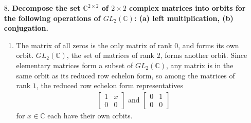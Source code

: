 \documentclass[a4paper,12pt]{article}
\begin{document}
\begin{enumerate}
    \item[8.]
        \boldmath
        \textbf{Decompose the set $\mathbb{C}^{2 \times 2}$ of $2 \times 2$ complex matrices into orbits for the following operations of $GL_2(\mathbb{C})$: (a) left multiplication, (b) conjugation.} \par
        \unboldmath
        \begin{enumerate}
            \item
                The matrix of all zeros is the only matrix of rank $0$, and forms its own orbit. $GL_2(\mathbb{C})$, the set of matrices of rank 2, forms another orbit. Since elementary matrices form a subset of $GL_2(\mathbb{C})$, any matrix is in the same orbit as its reduced row echelon form, so among the matrices of rank $1$, the reduced row echelon form representatives
                \begin{align*}
                    \left[ \begin{array}{cc}
                            1 & x \\
                            0 & 0
                    \end{array} \right]
                    \text{ and }
                    \left[ \begin{array}{cc}
                            0 & 1 \\
                            0 & 0
                    \end{array} \right]
                \end{align*}
                for $x \in \mathbb{C}$ each have their own orbits.


\end{enumerate}
\end{enumerate}
\end{document}
